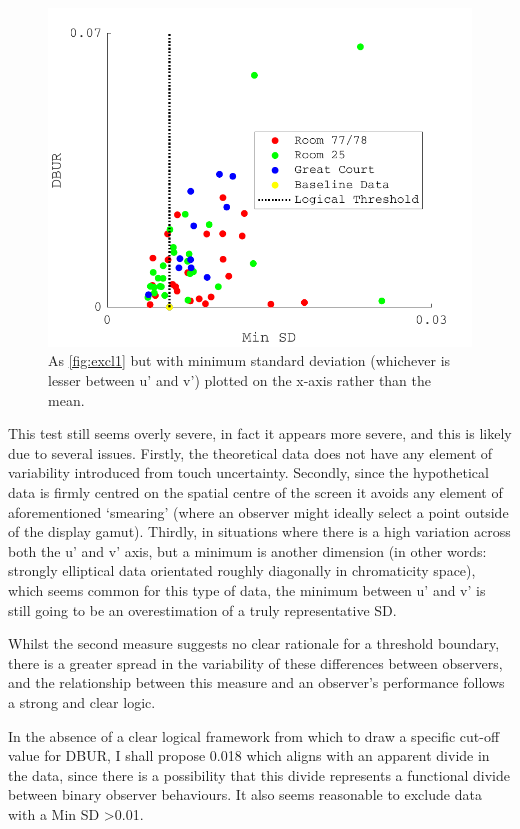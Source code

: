 \begin{figure}[hbtp] 
\includegraphics[max width=\textwidth]{figs/tablet/excl2.pdf} 
\caption{As \ref{fig:excl1} but with minimum standard deviation (whichever is lesser between u' and v') plotted on the x-axis rather than the mean.}
\label{fig:excl2}
\end{figure}

This test still seems overly severe, in fact it appears more severe, and this is likely due to several issues. Firstly, the theoretical data does not have any element of variability introduced from touch uncertainty. Secondly, since the hypothetical data is firmly centred on the spatial centre of the screen it avoids any element of aforementioned `smearing' (where an observer might ideally select a point outside of the display gamut). Thirdly, in situations where there is a high variation across both the u' and v' axis, but a minimum is another dimension (in other words: strongly elliptical data orientated roughly diagonally in chromaticity space), which seems common for this type of data, the minimum between u' and v' is still going to be an overestimation of a truly representative SD.

Whilst the second measure suggests no clear rationale for a threshold boundary, there is a greater spread in the variability of these differences between observers, and the relationship between this measure and an observer’s performance follows a strong and clear logic.

In the absence of a clear logical framework from which to draw a specific cut-off value for DBUR, I shall propose 0.018 which aligns with an apparent divide in the data, since there is a possibility that this divide represents a functional divide between binary observer behaviours. It also seems reasonable to exclude data with a Min SD \textgreater 0.01.

